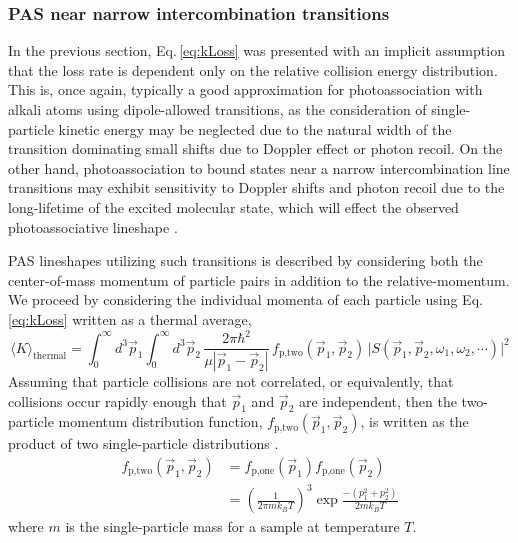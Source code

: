 \subsubsection{PAS near narrow intercombination transitions} \label{sssec:narrow_pa}
In the previous section, Eq.\,\ref{eq:kLoss} was presented with an implicit assumption that the loss rate is dependent only on the relative collision energy distribution.
This is, once again, typically a good approximation for photoassociation with alkali atoms using dipole-allowed transitions, as the consideration of single-particle kinetic energy may be neglected due to the natural width of the transition dominating small shifts due to Doppler effect or photon recoil.
On the other hand, photoassociation to bound states near a narrow intercombination line transitions may exhibit sensitivity to Doppler shifts and photon recoil due to the long-lifetime of the excited molecular state, which will effect the observed photoassociative lineshape \cite{Ciuryo2004, Borkowski2014a, Nicholson2015a, Reschovsky2018, Pachomov2017}.

PAS lineshapes utilizing such transitions is described by considering both the center-of-mass momentum of particle pairs in addition to the relative-momentum.
We proceed by considering the individual momenta of each particle using Eq.\,\ref{eq:kLoss} written as a thermal average,
\begin{equation} \label{eq:onePasMom}
	 \langle K \rangle_\text{thermal} = \int_0^{\infty} d^3\vec{p}_1 \int_0^{\infty} d^3\vec{p}_2 \,\frac{2 \pi \hbar^2}{\mu |\vec{p}_1 - \vec{p}_2|} \, f_\text{p,two}( \vec{p}_1, \vec{p}_2 ) \, \vert  S(\vec{p}_1, \vec{p}_2, \omega_1, \omega_2, \cdots) \vert^2  
\end{equation}
Assuming that particle collisions are not correlated, or equivalently, that collisions occur rapidly enough that $\vec{p}_1$ and $\vec{p}_2$ are independent, then the two-particle momentum distribution function, $f_\text{p,two}( \vec{p}_1, \vec{p}_2 )$, is written as the product of two single-particle distributions \cite{Ehrenfest2015,Chliamovitch2017,Brown2008}. 
\begin{equation} \label{eq:3two_particle_prob}
\begin{split}
		 f_\text{p,two}( \vec{p}_1, \vec{p}_2 ) &= f_\text{p,one}( \vec{p}_1 ) f_\text{p,one}( \vec{p}_2 ) \\
		  &= \left(\frac{1}{2 \pi m k_B T}\right)^3 \exp{\frac{-(p_1^2 + p_2^2)}{2 m k_B T}}
\end{split}
\end{equation}
where $m$ is the single-particle mass for a sample at temperature $T$.

